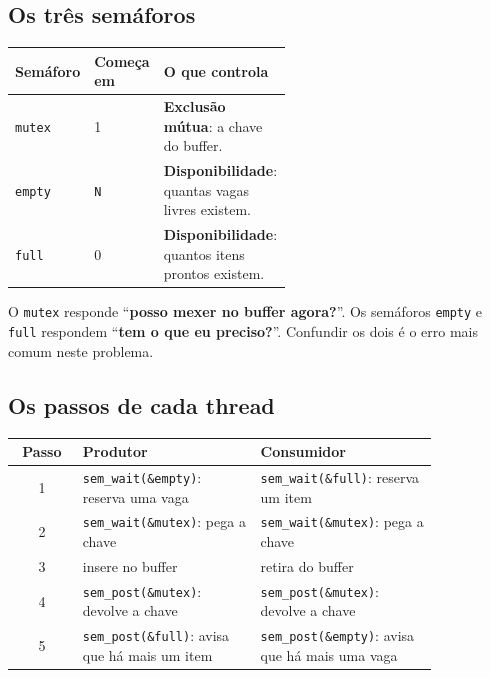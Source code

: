 \documentclass[11pt,a4paper]{article}
\newcommand{\cmd}[1]{\texttt{#1}}
\begin{document}
\subsection{Os três semáforos}

\begin{center}
\begin{tabular}{@{}llR{0.55\linewidth}@{}}
\toprule
\textbf{Semáforo} & \textbf{Começa em} & \textbf{O que controla} \\
\midrule
\cmd{mutex} & 1 & \textbf{Exclusão mútua}: a chave do buffer. \\
\cmd{empty} & \cmd{N} & \textbf{Disponibilidade}: quantas vagas livres existem. \\
\cmd{full} & 0 & \textbf{Disponibilidade}: quantos itens prontos existem. \\
\bottomrule
\end{tabular}
\end{center}

\begin{definicao}
O \cmd{mutex} responde ``\textbf{posso mexer no buffer agora?}''. Os semáforos \cmd{empty} e \cmd{full} respondem ``\textbf{tem o que eu preciso?}''. Confundir os dois é o erro mais comum neste problema.
\end{definicao}

\subsection{Os passos de cada thread}

\begin{center}
\begin{tabular}{@{}cR{0.42\linewidth}R{0.42\linewidth}@{}}
\toprule
\textbf{Passo} & \textbf{Produtor} & \textbf{Consumidor} \\
 & \cmd{sem\_wait(\&empty)}: reserva uma vaga & \cmd{sem\_wait(\&full)}: reserva um item \\
2 & \cmd{sem\_wait(\&mutex)}: pega a chave & \cmd{sem\_wait(\&mutex)}: pega a chave \\
3 & insere no buffer & retira do buffer \\
4 & \cmd{sem\_post(\&mutex)}: devolve a chave & \cmd{sem\_post(\&mutex)}: devolve a chave \\
5 & \cmd{sem\_post(\&full)}: avisa que há mais um item & \cmd{sem\_post(\&empty)}: avisa que há mais uma vaga \\
\bottomrule
\end{tabular}
\end{center}
\end{document}
